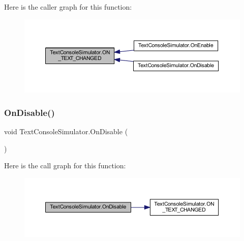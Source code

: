 Here is the caller graph for this function\+:
\nopagebreak
\begin{figure}[H]
\begin{center}
\leavevmode
\includegraphics[width=350pt]{class_text_console_simulator_adcb9117e3ef855ea84c1d5cea9c40e0f_icgraph}
\end{center}
\end{figure}
\mbox{\label{class_text_console_simulator_a0ba30e1537527a205ce4870e7132ed24}} 
\subsubsection{\texorpdfstring{On\+Disable()}{OnDisable()}}
{\footnotesize\ttfamily void Text\+Console\+Simulator.\+On\+Disable (\begin{DoxyParamCaption}{ }\end{DoxyParamCaption})\hspace{0.3cm}{\ttfamily [private]}}

Here is the call graph for this function\+:
\nopagebreak
\begin{figure}[H]
\begin{center}
\leavevmode
\includegraphics[width=350pt]{class_text_console_simulator_a0ba30e1537527a205ce4870e7132ed24_cgraph}
\end{center}
\end{figure}
\mbox{\label{class_text_console_simulator_af32c7062f7ff475db935b844fa00927a}} 
